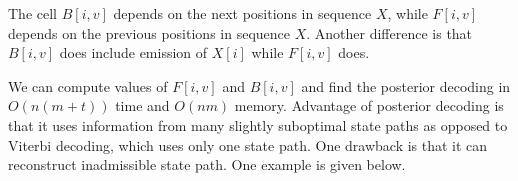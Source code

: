 The cell $B[i,v]$ depends on the next positions in sequence $X$,
while $F[i,v]$ depends on the previous positions in sequence $X$. Another
difference is that $B[i,v]$ does include emission of $X[i]$ while $F[i,v]$ does.

We can compute values of $F[i,v]$ and $B[i,v]$ and find the posterior decoding
in $O(n(m+t))$ time and $O(nm)$ memory.  Advantage of posterior decoding is
that it uses information from many slightly suboptimal state paths as opposed
to Viterbi decoding, which uses only one state path. One drawback is that it
can reconstruct inadmissible state path. One example is given below.



